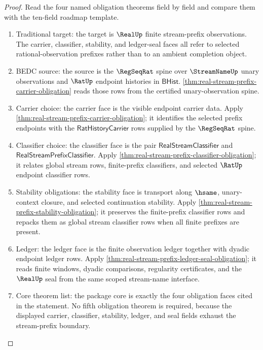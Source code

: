 \begin{proof}
Read the four named obligation theorems field by field and compare them with
the ten-field roadmap template.

\begin{enumerate}
\item Traditional target: the target is $\RealUp$ finite stream-prefix
observations. The carrier, classifier, stability, and ledger-seal faces all
refer to selected rational-observation prefixes rather than to an ambient
completion object.

\item BEDC source: the source is the $\RegSeqRat$ spine over $\StreamNameUp$
unary observations and $\RatUp$ endpoint histories in $\mathsf{BHist}$.
\autoref{thm:real-stream-prefix-carrier-obligation} reads those rows from the
certified unary-observation spine.

\item Carrier choice: the carrier face is the visible endpoint carrier data.
Apply \autoref{thm:real-stream-prefix-carrier-obligation}; it identifies the
selected prefix endpoints with the $\mathsf{RatHistoryCarrier}$ rows supplied
by the $\RegSeqRat$ spine.

\item Classifier choice: the classifier face is the pair
$\mathsf{RealStreamClassifier}$ and
$\mathsf{RealStreamPrefixClassifier}$. Apply
\autoref{thm:real-stream-prefix-classifier-obligation}; it relates global
stream rows, finite-prefix classifiers, and selected $\RatUp$ endpoint
classifier rows.

\item Stability obligations: the stability face is transport along $\hsame$,
unary-context closure, and selected continuation stability. Apply
\autoref{thm:real-stream-prefix-stability-obligation}; it preserves the
finite-prefix classifier rows and repacks them as global stream classifier
rows when all finite prefixes are present.

\item Ledger: the ledger face is the finite observation ledger together with
dyadic endpoint ledger rows. Apply
\autoref{thm:real-stream-prefix-ledger-seal-obligation}; it reads finite
windows, dyadic comparisons, regularity certificates, and the $\RealUp$ seal
from the same scoped stream-name interface.

\item Core theorem list: the package core is exactly the four obligation
faces cited in the statement. No fifth obligation theorem is required, because
the displayed carrier, classifier, stability, ledger, and seal fields exhaust
the stream-prefix boundary.


\end{enumerate}
\end{proof}
